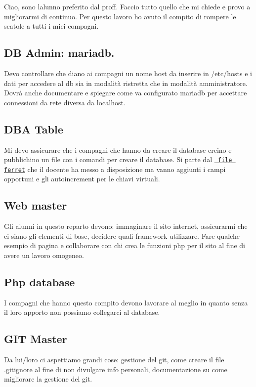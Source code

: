 Ciao, sono l\textquotesingle{}alunno preferito dal proff. Faccio tutto quello che mi chiede e provo a migliorarmi di continuo. Per questo lavoro ho avuto il compito di rompere le scatole a tutti i miei compagni.

\subsection*{DB Admin\+: mariadb.}

Devo controllare che diano ai compagni un nome host da inserire in /etc/hosts e i dati per accedere al db sia in modalità ristretta che in modalità amministratore. Dovrà anche documentare e spiegare come va configurato mariadb per accettare connessioni da rete diversa da localhost.

\subsection*{D\+BA Table}

Mi devo assicurare che i compagni che hanno da creare il database creino e pubblichino un file con i comandi per creare il database. Si parte dal \href{./manuali/documenti.ger}{\texttt{ file ferret}} che il docente ha messo a disposizione ma vanno aggiunti i campi opportuni e gli autoincrement per le chiavi virtuali.

\subsection*{Web master}

Gli alunni in questo reparto devono\+: immaginare il sito internet, assicurarmi che ci siano gli elementi di base, decidere quali framework utilizzare. Fare qualche esempio di pagina e collaborare con chi crea le funzioni php per il sito al fine di avere un lavoro omogeneo.

\subsection*{Php database}

I compagni che hanno questo compito devono lavorare al meglio in quanto senza il loro apporto non possiamo collegarci al database.

\subsection*{G\+IT Master}

Da lui/loro ci aspettiamo grandi cose\+: gestione del git, come creare il file .gitignore al fine di non divulgare info personali, documentazione su come migliorare la gestione del git.

